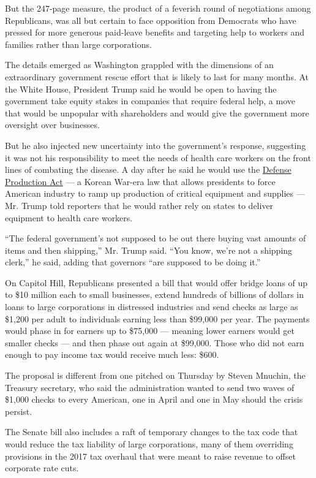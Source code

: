 But the 247-page measure, the product of a feverish round of
negotiations among Republicans, was all but certain to face opposition
from Democrats who have pressed for more generous paid-leave benefits
and targeting help to workers and families rather than large
corporations.

The details emerged as Washington grappled with the dimensions of an
extraordinary government rescue effort that is likely to last for many
months. At the White House, President Trump said he would be open to
having the government take equity stakes in companies that require
federal help, a move that would be unpopular with shareholders and would
give the government more oversight over businesses.

But he also injected new uncertainty into the government's response,
suggesting it was not his responsibility to meet the needs of health
care workers on the front lines of combating the disease. A day after he
said he would use the
\href{https://www.nytimes3xbfgragh.onion/2020/02/28/us/politics/trump-coronavirus.html}{Defense
Production Act} --- a Korean War-era law that allows presidents to force
American industry to ramp up production of critical equipment and
supplies --- Mr. Trump told reporters that he would rather rely on
states to deliver equipment to health care workers.

``The federal government's not supposed to be out there buying vast
amounts of items and then shipping,'' Mr. Trump said. ``You know, we're
not a shipping clerk,'' he said, adding that governors ``are supposed to
be doing it.''

On Capitol Hill, Republicans presented a bill that would offer bridge
loans of up to \$10 million each to small businesses, extend hundreds of
billions of dollars in loans to large corporations in distressed
industries and send checks as large as \$1,200 per adult to individuals
earning less than \$99,000 per year. The payments would phase in for
earners up to \$75,000 --- meaning lower earners would get smaller
checks --- and then phase out again at \$99,000. Those who did not earn
enough to pay income tax would receive much less: \$600.

The proposal is different from one pitched on Thursday by Steven
Mnuchin, the Treasury secretary, who said the administration wanted to
send two waves of \$1,000 checks to every American, one in April and one
in May should the crisis persist.

The Senate bill also includes a raft of temporary changes to the tax
code that would reduce the tax liability of large corporations, many of
them overriding provisions in the 2017 tax overhaul that were meant to
raise revenue to offset corporate rate cuts.

